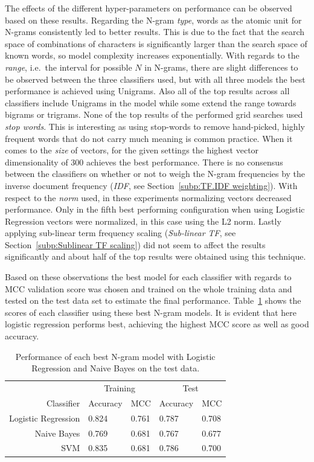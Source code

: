 The effects of the different hyper-parameters on performance can be observed based on these results. Regarding the N-gram \emph{type}, words as the atomic unit for N-grams consistently led to better results. This is due to the fact that the search space of combinations of characters is significantly larger than the search space of known words, so model complexity increases exponentially.
With regards to the \emph{range}, i.e.\ the interval for possible $N$ in N-grams, there are slight differences to be observed between the three classifiers used, but with all three models the best performance is achieved using Unigrams. Also all of the top results across all classifiers include Unigrams in the model while some extend the range towards bigrams or trigrams.
None of the top results of the performed grid searches used \emph{stop words}. This is interesting as using stop-words to remove hand-picked, highly frequent words that do not carry much meaning is common practice.
When it comes to the \emph{size} of vectors, for the given settings the highest vector dimensionality of 300 achieves the best performance.
There is no consensus between the classifiers on whether or not to weigh the N-gram frequencies by the inverse document frequency (\emph{IDF}, see Section~\ref{subp:TF.IDF weighting}). With respect to the \emph{norm} used, in these experiments normalizing vectors decreased performance. Only in the fifth best performing configuration when using Logistic Regression vectors were normalized, in this case using the L2 norm.
Lastly applying sub-linear term frequency scaling (\emph{Sub-linear TF}, see Section~\ref{subp:Sublinear TF scaling}) did not seem to affect the results significantly and about half of the top results were obtained using this technique.

Based on these observations the best model for each classifier with regards to \gls{MCC} validation score was chosen and trained on the whole training data and tested on the test data set to estimate the final performance. Table~\ref{tab:Ngram Grid Search Scores} shows the scores of each classifier using these best N-gram models. It is evident that here logistic regression performs best, achieving the highest \gls{MCC} score as well as good accuracy.

\begin{table}
  \begin{center}
  \begin{tabular}{ r | *2l | *2l }
    \toprule
     & \multicolumn{2}{c|}{Training} & \multicolumn{2}{c}{Test}\\
    Classifier & Accuracy & MCC & Accuracy & MCC \\
    \midrule
    Logistic Regression & 0.824 & 0.761 & 0.787 & 0.708 \\
    Naive Bayes         & 0.769 & 0.681 & 0.767 & 0.677 \\
    SVM                 & 0.835 & 0.681 & 0.786 & 0.700 \\
    \bottomrule
  \end{tabular}
  \caption{Performance of each best N-gram model with Logistic Regression and Naive Bayes on the test data.}
\label{tab:Ngram Grid Search Scores}
\end{center}
\end{table}

